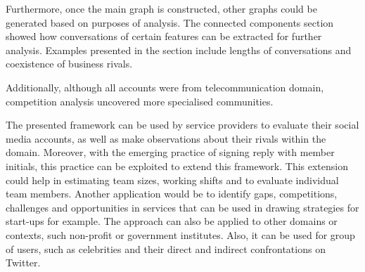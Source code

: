 \documentclass[sigconf]{acmart}
\begin{document}
Furthermore, once the main graph is constructed, other graphs could be
generated based on purposes of analysis. The connected components
section showed how conversations of certain features can be extracted
for further analysis. Examples presented in the section include
lengths of conversations and coexistence of business rivals.

Additionally, although all accounts were from telecommunication domain, competition analysis
uncovered more specialised communities.

The presented framework can be used by service providers to evaluate
their social media accounts, as well as make observations about their
rivals within the domain. Moreover, with the emerging practice of
signing reply with member initials, this practice can be exploited to
extend this framework. This extension could help in estimating team
sizes, working shifts and to evaluate individual team members. Another
application would be to identify gaps, competitions, challenges and
opportunities in services that can be used in drawing strategies for
start-ups for example. The approach can also be applied to other
domains or contexts, such non-profit or government institutes. Also,
it can be used for group of users, such as celebrities and their
direct and indirect confrontations on Twitter.





 
\end{document}
